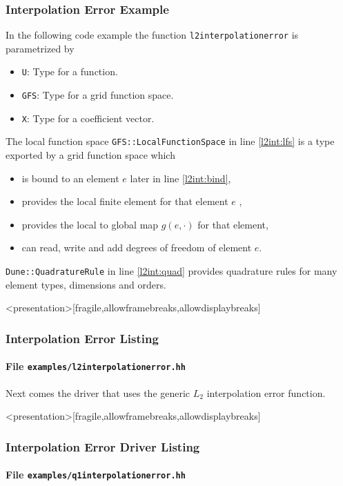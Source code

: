 \begin{frame}
\frametitle<presentation>{Interpolation Error Example}
In the following code example the
function \lstinline{l2interpolationerror} is parametrized by
\begin{itemize}
\item \lstinline{U}: Type for a function. 
\item \lstinline{GFS}: Type for a grid function space.
\item \lstinline{X}: Type for a coefficient vector.
\end{itemize}
The local function space
\lstinline{GFS::LocalFunctionSpace} in line \ref{l2int:lfs} is a type 
exported by a grid function space which
\begin{itemize}
\item is bound to an element $e$ later in line \ref{l2int:bind},
\item provides the local finite element for that element $e$ ,
\item provides the local to global map $g(e,\cdot)$ for that element,
\item can read, write and add degrees of freedom of element $e$.
\end{itemize}
\lstinline{Dune::QuadratureRule} in line \ref{l2int:quad} provides
quadrature rules for many element types, dimensions and orders.
\end{frame}

\begin{frame}<presentation>[fragile,allowframebreaks,allowdisplaybreaks]
\frametitle<presentation>{Interpolation Error Listing}
\framesubtitle<presentation>{File \texttt{examples/l2interpolationerror.hh}}

\end{frame}

Next comes the driver that uses the generic $L_2$ interpolation error
function.

\begin{frame}<presentation>[fragile,allowframebreaks,allowdisplaybreaks]
\frametitle<presentation>{Interpolation Error Driver Listing}
\framesubtitle<presentation>{File \texttt{examples/q1interpolationerror.hh}}

\end{frame}


